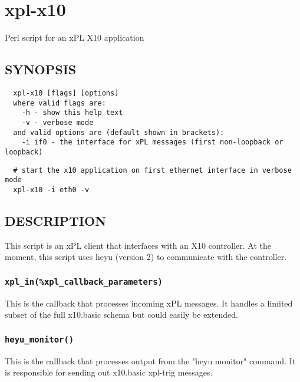 \section{xpl-x10\label{xpl-x10}}


Perl script for an xPL X10 application

\subsection*{SYNOPSIS\label{xpl-x10_SYNOPSIS}}
\begin{verbatim}
  xpl-x10 [flags] [options]
  where valid flags are:
    -h - show this help text
    -v - verbose mode
  and valid options are (default shown in brackets):
    -i if0 - the interface for xPL messages (first non-loopback or loopback)
\end{verbatim}
\begin{verbatim}
  # start the x10 application on first ethernet interface in verbose mode
  xpl-x10 -i eth0 -v
\end{verbatim}
\subsection*{DESCRIPTION\label{xpl-x10_DESCRIPTION}}


This script is an xPL client that interfaces with an X10 controller.
At the moment, this script uses heyu (version 2) to communicate with
the controller.

\subsubsection*{\texttt{xpl\_in(\%xpl\_callback\_parameters)}\label{xpl-x10_xpl_in_xpl_callback_parameters_}}


This is the callback that processes incoming xPL messages.  It handles
a limited subset of the full x10.basic schema but could easily be
extended.

\subsubsection*{\texttt{heyu\_monitor()}\label{xpl-x10_heyu_monitor_}}


This is the callback that processes output from the "heyu monitor"
command.  It is responsible for sending out x10.basic xpl-trig
messages.

